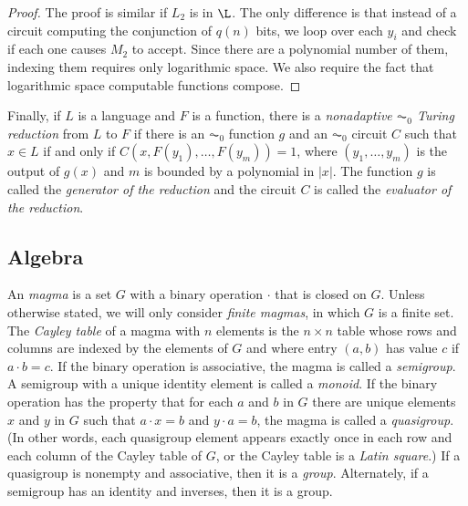\documentclass{article}
\begin{document}
\begin{proof}
  The proof is similar if $L_2$ is in $\L$.
  The only difference is that instead of a circuit computing the conjunction of $q(n)$ bits, we loop over each $y_i$ and check if each one causes $M_2$ to accept.
  Since there are a polynomial number of them, indexing them requires only logarithmic space.
  We also require the fact that logarithmic space computable functions compose.
\end{proof}

Finally, if $L$ is a language and $F$ is a function, there is a \emph{nonadaptive $\AC_0$ Turing reduction} from $L$ to $F$ if there is an $\AC_0$ function $g$ and an $\AC_0$ circuit $C$ such that $x \in L$ if and only if $C(x, F(y_1), \dotsc, F(y_m)) = 1$, where $(y_1, \dotsc, y_m)$ is the output of $g(x)$ and $m$ is bounded by a polynomial in $|x|$.
The function $g$ is called the \emph{generator of the reduction} and the circuit $C$ is called the \emph{evaluator of the reduction}.

\subsection{Algebra}

An \emph{magma} is a set $G$ with a binary operation $\cdot$ that is closed on $G$.
Unless otherwise stated, we will only consider \emph{finite magmas}, in which $G$ is a finite set.
The \emph{Cayley table} of a magma with $n$ elements is the $n \times n$ table whose rows and columns are indexed by the elements of $G$ and where entry $(a, b)$ has value $c$ if $a \cdot b = c$.
If the binary operation is associative, the magma is called a \emph{semigroup}.
A semigroup with a unique identity element is called a \emph{monoid}.
If the binary operation has the property that for each $a$ and $b$ in $G$ there are unique elements $x$ and $y$ in $G$ such that $a \cdot x = b$ and $y \cdot a = b$, the magma is called a \emph{quasigroup}.
(In other words, each quasigroup element appears exactly once in each row and each column of the Cayley table of $G$, or the Cayley table is a \emph{Latin square}.)
If a quasigroup is nonempty and associative, then it is a \emph{group}.
Alternately, if a semigroup has an identity and inverses, then it is a group.
\end{document}
